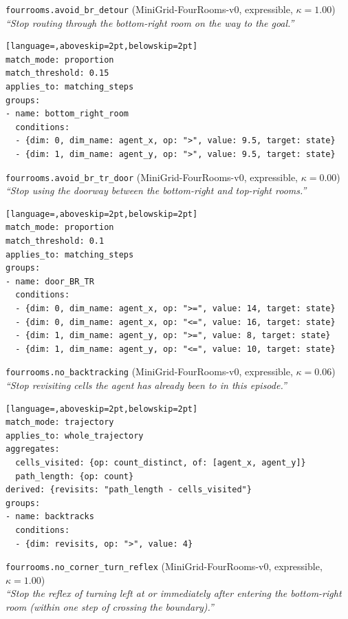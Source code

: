 \par\medskip\noindent\texttt{fourrooms.avoid\_br\_detour} (MiniGrid-FourRooms-v0, expressible, $\kappa=1.00$)\\
\textit{``Stop routing through the bottom-right room on the way to the goal.''}\nopagebreak
\begin{lstlisting}[language=,aboveskip=2pt,belowskip=2pt]
match_mode: proportion
match_threshold: 0.15
applies_to: matching_steps
groups:
- name: bottom_right_room
  conditions:
  - {dim: 0, dim_name: agent_x, op: ">", value: 9.5, target: state}
  - {dim: 1, dim_name: agent_y, op: ">", value: 9.5, target: state}
\end{lstlisting}
\par\medskip\noindent\texttt{fourrooms.avoid\_br\_tr\_door} (MiniGrid-FourRooms-v0, expressible, $\kappa=0.00$)\\
\textit{``Stop using the doorway between the bottom-right and top-right rooms.''}\nopagebreak
\begin{lstlisting}[language=,aboveskip=2pt,belowskip=2pt]
match_mode: proportion
match_threshold: 0.1
applies_to: matching_steps
groups:
- name: door_BR_TR
  conditions:
  - {dim: 0, dim_name: agent_x, op: ">=", value: 14, target: state}
  - {dim: 0, dim_name: agent_x, op: "<=", value: 16, target: state}
  - {dim: 1, dim_name: agent_y, op: ">=", value: 8, target: state}
  - {dim: 1, dim_name: agent_y, op: "<=", value: 10, target: state}
\end{lstlisting}
\par\medskip\noindent\texttt{fourrooms.no\_backtracking} (MiniGrid-FourRooms-v0, expressible, $\kappa=0.06$)\\
\textit{``Stop revisiting cells the agent has already been to in this episode.''}\nopagebreak
\begin{lstlisting}[language=,aboveskip=2pt,belowskip=2pt]
match_mode: trajectory
applies_to: whole_trajectory
aggregates:
  cells_visited: {op: count_distinct, of: [agent_x, agent_y]}
  path_length: {op: count}
derived: {revisits: "path_length - cells_visited"}
groups:
- name: backtracks
  conditions:
  - {dim: revisits, op: ">", value: 4}
\end{lstlisting}
\par\medskip\noindent\texttt{fourrooms.no\_corner\_turn\_reflex} (MiniGrid-FourRooms-v0, expressible, $\kappa=1.00$)\\
\textit{``Stop the reflex of turning left at or immediately after entering the bottom-right room (within one step of crossing the boundary).''}\nopagebreak
